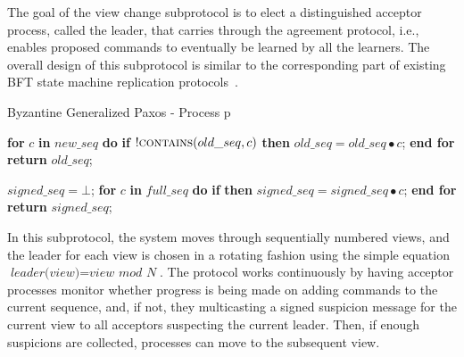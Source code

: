 The goal of the view change subprotocol is to elect a distinguished acceptor process, called the leader, that carries through the agreement protocol, i.e., enables proposed commands to eventually be learned by all the learners. The overall design of this subprotocol is similar to the corresponding part of existing BFT state machine replication protocols~\cite{CL99}.\par
\vspace{-0.4cm}
\begin{algorithm}
	\caption{Byzantine Generalized Paxos - Process p}
	\vspace*{-.6cm}
	\begin{multicols}{2}
		\begin{algorithmic}[1]		
			\State \textbf{for} $c$ \textbf{in} $new\_seq$ \textbf{do} 
			\State \hspace{\algorithmicindent} \textbf{if} $!\Call{contains}{old\_seq,c}$ \textbf{then}
			\State \hspace{\algorithmicindent}\hspace{\algorithmicindent}\hspace{\algorithmicindent} $old\_seq =  old\_seq \bullet c$;
			\State \textbf{end for}
			\State \textbf{return} $old\_seq$;
			\EndFunction
			
			\State
			\State $signed\_seq = \bot$;
			\State \textbf{for} $c$ \textbf{in} $full\_seq$ \textbf{do}
			\State \hspace{\algorithmicindent} \textbf{if}  \textbf{then}
			\State \hspace{\algorithmicindent}\hspace{\algorithmicindent} $signed\_seq = signed\_seq \bullet c$;
			\State \textbf{end for}
			\State \textbf{return} $signed\_seq$;
			\EndFunction
		\end{algorithmic}
	\end{multicols}
	\vspace*{-.4cm}
\end{algorithm}
\vspace{-0.4cm}
In this subprotocol, the system moves through sequentially numbered views, and the leader for each view is chosen in a rotating fashion using the simple equation $\textit{leader(view)}=\textit{view mod N}$. The protocol works continuously by having acceptor processes monitor whether progress is being made on adding commands to the current sequence, and, if not, they multicasting a signed {\sc suspicion} message for the current view to all acceptors suspecting the current leader. Then, if enough suspicions are collected, processes can move to the subsequent view. 
